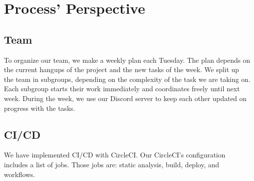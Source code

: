 \section{Process' Perspective}

\subsection{Team}
To organize our team, we make a weekly plan each Tuesday. The plan depends on the current hangups of the project and the new tasks of the week. \newline
We split up the team in subgroups, depending on the complexity of the task we are taking on.
Each subgroup starts their work immediately and coordinates freely until next week. During the week, we use our Discord server to keep each other updated on progress with the tasks.


\subsection{CI/CD}\label{CI/CD}

We have implemented CI/CD with CircleCI. Our CircleCI's configuration includes a list of jobs. Those jobs are: static analysis, build, deploy, and workflows.

